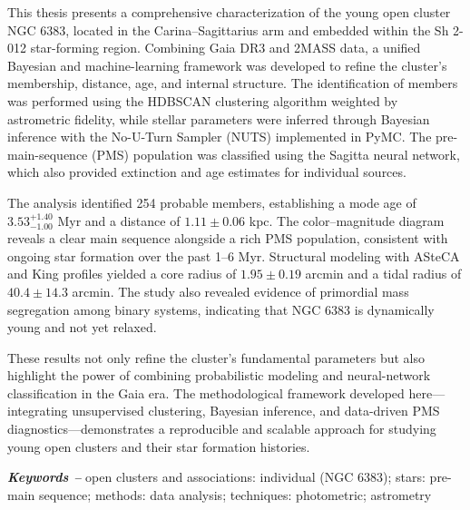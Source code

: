 \documentclass[../main.tex]{subfiles}
\begin{document}
\thispagestyle{abstractpage}
\vspace*{2\baselineskip}

\noindent
This thesis presents a comprehensive characterization of the young open cluster NGC 6383, located in the Carina–Sagittarius arm and embedded within the Sh 2-012 star-forming region. Combining Gaia DR3 and 2MASS data, a unified Bayesian and machine-learning framework was developed to refine the cluster’s membership, distance, age, and internal structure. The identification of members was performed using the HDBSCAN clustering algorithm weighted by astrometric fidelity, while stellar parameters were inferred through Bayesian inference with the No-U-Turn Sampler (NUTS) implemented in PyMC. The pre-main-sequence (PMS) population was classified using the Sagitta neural network, which also provided extinction and age estimates for individual sources.

The analysis identified 254 probable members, establishing a mode age of $3.53^{+1.40}_{-1.00}$ Myr and a distance of $1.11 \pm 0.06$ kpc. The color–magnitude diagram reveals a clear main sequence alongside a rich PMS population, consistent with ongoing star formation over the past 1–6 Myr. Structural modeling with ASteCA and King profiles yielded a core radius of $1.95 \pm 0.19$ arcmin and a tidal radius of $40.4 \pm 14.3$ arcmin. The study also revealed evidence of primordial mass segregation among binary systems, indicating that NGC 6383 is dynamically young and not yet relaxed.

These results not only refine the cluster’s fundamental parameters but also highlight the power of combining probabilistic modeling and neural-network classification in the Gaia era. The methodological framework developed here—integrating unsupervised clustering, Bayesian inference, and data-driven PMS diagnostics—demonstrates a reproducible and scalable approach for studying young open clusters and their star formation histories.
\par\vspace*{\fill}
\textbf{\textit{Keywords --}} open clusters and associations: individual (NGC 6383); stars: pre-main sequence; methods: data analysis; techniques: photometric; astrometry
\end{document}
